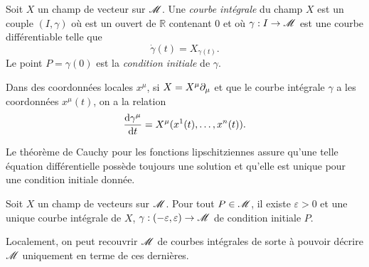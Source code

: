 \documentclass[a4paper,11pt]{report}
\begin{document}
            \begin{definition}
             Soit $X$ un champ de vecteur sur $\mathscr{M}$. Une \textit{courbe intégrale} du champ $X$ est un couple $(I,\gamma)$ où est un ouvert de $\mathbb{R}$ contenant 0 et où $\gamma:I\to\mathscr{M}$ est une courbe différentiable telle que
             \begin{equation}
                 \dot{\gamma}(t) = X_{\gamma(t)}.
             \end{equation}
             Le point $P = \gamma(0)$ est la \textit{condition initiale} de $\gamma$.
            \end{definition}
            
            Dans des coordonnées locales $x^\mu$, si $X = X^\mu\partial_\mu$ et que le courbe intégrale $\gamma$ a les coordonnées $x^\mu(t)$, on a la relation
            \begin{align}
                \dv{\gamma^\mu}{t} = X^\mu(x^1(t),\dots,x^n(t)).
            \end{align}
            
            Le théorème de Cauchy pour les fonctions lipschitziennes assure qu'une telle équation différentielle possède toujours une solution et qu'elle est unique pour une condition initiale donnée.
            
            \begin{prop}
            \begin{leftbar}
                Soit $X$ un champ de vecteurs sur $\mathscr{M}$. Pour tout $P\in\mathscr{M}$, il existe $\varepsilon>0$ et une unique courbe intégrale de $X$, $\gamma:(-\varepsilon,\varepsilon)\to\mathscr{M}$ de condition initiale $P$.
            \end{leftbar}
            \end{prop}
            
            Localement, on peut recouvrir $\mathscr{M}$ de courbes intégrales de sorte à pouvoir décrire $\mathscr{M}$ uniquement en terme de ces dernières.
            
\end{document}
